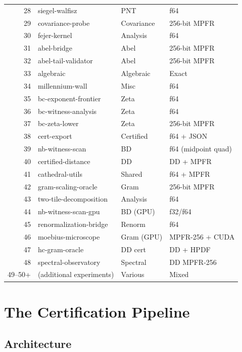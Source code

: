 \documentclass[11pt,a4paper]{article}
\begin{document}
\begin{center}
\begin{tabular}{@{}rlll@{}}
28 & siegel-walfisz & PNT & f64 \\
29 & covariance-probe & Covariance & 256-bit MPFR \\
30 & fejer-kernel & Analysis & f64 \\
\midrule
31 & abel-bridge & Abel & 256-bit MPFR \\
32 & abel-tail-validator & Abel & 256-bit MPFR \\
33 & algebraic & Algebraic & Exact \\
34 & millennium-wall & Misc & f64 \\
\midrule
35 & bc-exponent-frontier & Zeta & f64 \\
36 & bc-witness-analysis & Zeta & f64 \\
37 & bc-zeta-lower & Zeta & 256-bit MPFR \\
38 & cert-export & Certified & f64 + JSON \\
\midrule
39 & nb-witness-scan & BD & f64 (midpoint quad) \\
40 & certified-distance & DD & DD + MPFR \\
41 & cathedral-utils & Shared & f64 + MPFR \\
42 & gram-scaling-oracle & Gram & 256-bit MPFR \\
43 & two-tile-decomposition & Analysis & f64 \\
44 & nb-witness-scan-gpu & BD (GPU) & f32/f64 \\
45 & renormalization-bridge & Renorm & f64 \\
46 & moebius-microscope & Gram (GPU) & MPFR-256 + CUDA \\
47 & hc-gram-oracle & DD cert & DD + HPDF \\
48 & spectral-observatory & Spectral & DD MPFR-256 \\
49--50+ & (additional experiments) & Various & Mixed \\
\bottomrule
\end{tabular}
\end{center}

\section{The Certification Pipeline}

\subsection{Architecture}
\end{document}
